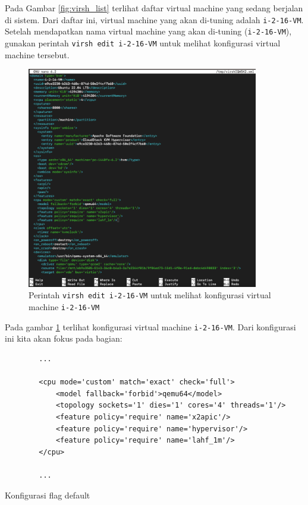 Pada Gambar \ref{fig:virsh_list} terlihat daftar virtual machine yang sedang berjalan di sistem. Dari daftar ini, virtual machine yang akan di-tuning adalah \texttt{i-2-16-VM}. Setelah mendapatkan nama virtual machine yang akan di-tuning (\texttt{i-2-16-VM}), gunakan perintah \texttt{virsh edit i-2-16-VM} untuk melihat konfigurasi virtual machine tersebut.

\begin{figure}
    \centering
    \includegraphics[width=0.9\textwidth]
    {assets/pics/virsh_edit1.png}
    \caption{Perintah \texttt{virsh edit i-2-16-VM} untuk melihat konfigurasi virtual machine \texttt{i-2-16-VM}}
    \label{fig:virsh_edit1}
\end{figure}

Pada gambar \ref{fig:virsh_edit1} terlihat konfigurasi virtual machine \texttt{i-2-16-VM}. Dari konfigurasi ini kita akan fokus pada bagian:

\begin{listing}[H]
    \begin{verbatim}
        ...

        <cpu mode='custom' match='exact' check='full'>
            <model fallback='forbid'>qemu64</model>
            <topology sockets='1' dies='1' cores='4' threads='1'/>
            <feature policy='require' name='x2apic'/>
            <feature policy='require' name='hypervisor'/> 
            <feature policy='require' name='lahf_1m'/>
        </cpu>
        
        ...
    \end{verbatim}
    \caption{Konfigurasi flag default}
    \label{code:default_kvm_xml}
\end{listing}


